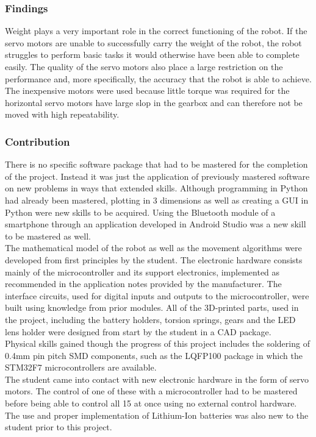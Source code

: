 \subsubsection*{Findings}
Weight plays a very important role in the correct functioning of the robot. If the servo motors are unable to successfully carry the weight of the robot, the robot struggles to perform basic tasks it would otherwise have been able to complete easily. The quality of the servo motors also place a large restriction on the performance and, more specifically, the accuracy that the robot is able to achieve. The inexpensive motors were used because little torque was required for the horizontal servo motors have large slop in the gearbox and can therefore not be moved with high repeatability.\\

\subsubsection*{Contribution}
There is no specific software package that had to be mastered for the completion of the project. Instead it was just the application of previously mastered software on new problems in ways that extended skills. Although programming in Python had already been mastered, plotting in 3 dimensions as well as creating a GUI in Python were new skills to be acquired. Using the Bluetooth module of a smartphone through an application developed in Android Studio was a new skill to be mastered as well.\\

The mathematical model of the robot as well as the movement algorithms were developed from first principles by the student. The electronic hardware consists mainly of the microcontroller and its support electronics, implemented as recommended in the application notes provided by the manufacturer. The interface circuits, used for digital inputs and outputs to the microcontroller, were built using knowledge from prior modules. All of the 3D-printed parts, used in the project, including the battery holders, torsion springs, gears and the LED lens holder were designed from start by the student in a CAD package.\\

Physical skills gained though the progress of this project includes the soldering of 0.4mm pin pitch SMD components, such as the LQFP100 package in which the STM32F7 microcontrollers are available.\\

The student came into contact with new electronic hardware in the form of servo motors. The control of one of these with a microcontroller had to be mastered before being able to control all 15 at once using no external control hardware. The use and proper implementation of Lithium-Ion batteries was also new to the student prior to this project.\\